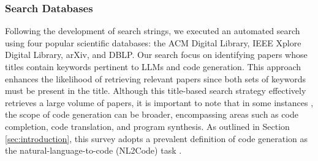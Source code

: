 
\subsubsection{Search Databases}
Following the development of search strings, we executed an automated search using four popular scientific databases: the ACM Digital Library, IEEE Xplore Digital Library, arXiv, and DBLP. 
Our search focus on identifying papers whose titles contain keywords pertinent to LLMs and code generation. 
This approach enhances the likelihood of retrieving relevant papers since both sets of keywords must be present in the title. 
Although this title-based search strategy effectively retrieves a large volume of papers, it is important to note that in some instances \cite{shojaee2023execution}, the scope of code generation can be broader, encompassing areas such as code completion, code translation, and program synthesis. 
As outlined in Section \ref{sec:introduction}, this survey adopts a prevalent definition of code generation as the natural-language-to-code (NL2Code) task \cite{austin2021program,athiwaratkun2022multi,zan2023large}.

